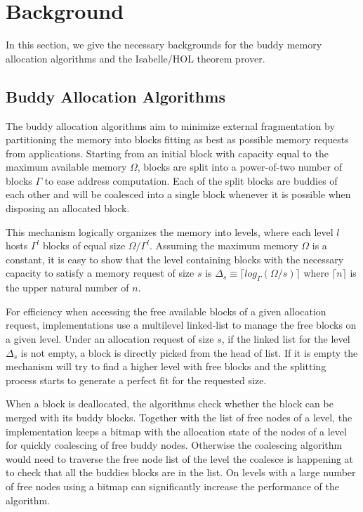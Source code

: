 \section{Background}
In this section, we give the necessary backgrounds for the buddy memory allocation algorithms and the Isabelle/HOL theorem prover.

\subsection{Buddy Allocation Algorithms}\label{sec:buddy}
The buddy allocation algorithms aim to minimize external fragmentation by partitioning the memory into blocks fitting as best as possible memory requests from applications. Starting from an initial block with capacity equal to the maximum available memory $\Omega$, blocks are split into a power-of-two number of blocks $\Gamma$ to ease address computation. Each of the split blocks are buddies of each other and will be coalesced into a single block whenever it is possible when disposing an allocated block.

This mechanism logically organizes the memory into levels, where each level $l$ hosts $\Gamma^l$ blocks of equal size $\Omega/{\Gamma}^l$. Assuming the maximum memory $\Omega$ is a constant, it is easy to show that the level containing blocks with the necessary capacity to satisfy a memory request of size $s$ is $\Delta_s \equiv \lceil log_\Gamma (\Omega / s) \rceil$ where $\lceil n \rceil$ is the upper natural number of $n$.

For efficiency when accessing the free available blocks of a given allocation request, implementations use a multilevel linked-list to manage the free blocks on a given level. Under an allocation request of size $s$, if the linked list for the level $\Delta_s$ is not empty, a block is directly picked from the head of list. If it is empty the mechanism will try to find a higher level with free blocks and the splitting process starts to generate a perfect fit for the requested size. 

When a block is deallocated, the algorithms check whether the block can be merged with its buddy blocks. Together with the list of free nodes of a level, the implementation keeps a bitmap with the allocation state of the nodes of a level for quickly coalescing of free buddy nodes. Otherwise the coalescing algorithm would need to traverse the free node list of the level the coalesce is happening at to check that all the buddies blocks are in the list. On levels with a large number of free nodes using a bitmap can significantly increase the performance of the algorithm.

